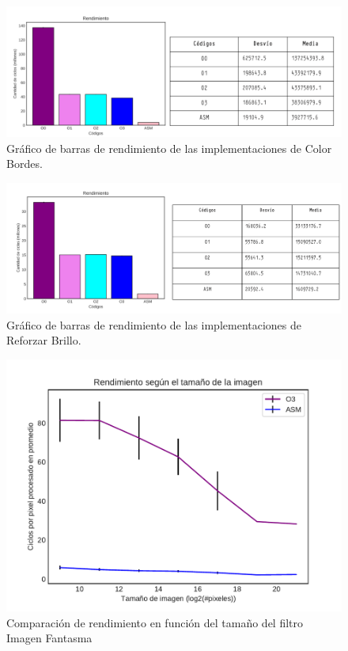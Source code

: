 \documentclass[a4paper]{article}
\begin{document}
\begin{figure}[h!]
	\includegraphics[scale=0.55]{img/ColorBordesConTabla.pdf}
	\caption{Gráfico de barras de rendimiento de las implementaciones de Color Bordes.}
\end{figure}	


\begin{figure}[h!]
	\includegraphics[scale=0.55]{img/ReforzarBrilloConTabla.pdf}
	\caption{Gráfico de barras de rendimiento de las implementaciones de Reforzar Brillo.}
\end{figure}



\begin{figure}[h!]
	\centering
	\includegraphics[scale=0.56]{img/ImagenFantasmaO3vsASM.pdf}
	\caption{Comparación de rendimiento en función del tamaño del filtro Imagen Fantasma}
\end{figure}	
\end{document}

